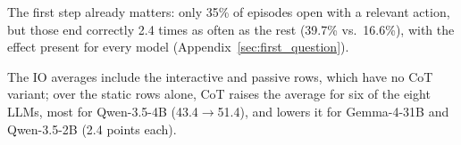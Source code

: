 The first step already matters: only 35\% of episodes open with a relevant action, but those end correctly 2.4 times as often as the rest (39.7\% vs.\ 16.6\%), with the effect present for every model (Appendix~\ref{sec:first_question}).


%
The IO averages include the interactive and passive rows, which have no CoT variant; over the static rows alone, CoT raises the average for six of the eight LLMs, most for Qwen-3.5-4B (43.4$\to$51.4), and lowers it for Gemma-4-31B and Qwen-3.5-2B (2.4 points each).


